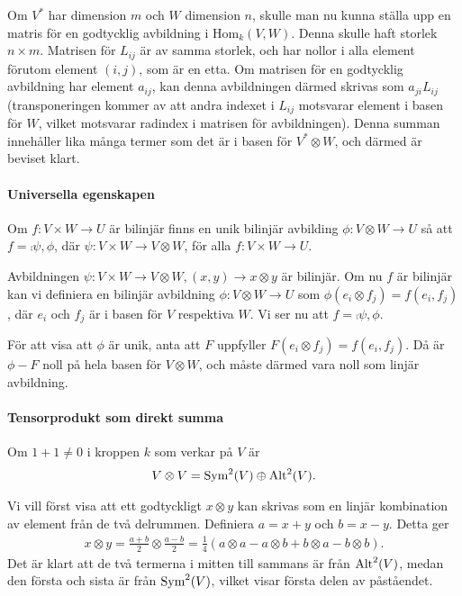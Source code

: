 Om $V^{*}$ har dimension $m$ och $W$ dimension $n$, skulle man nu kunna ställa upp en matris för en godtycklig avbildning i $\text{Hom}_{k}(V, W)$. Denna skulle haft storlek $n\times m$. Matrisen för $L_{ij}$ är av samma storlek, och har nollor i alla element förutom element $(i, j)$, som är en etta. Om matrisen för en godtycklig avbildning har element $a_{ij}$, kan denna avbildningen därmed skrivas som $a_{ji}L_{ij}$ (transponeringen kommer av att andra indexet i $L_{ij}$ motsvarar element i basen för $W$, vilket motsvarar radindex i matrisen för avbildningen). Denna summan innehåller lika många termer som det är i basen för $V^{*}\otimes W$, och därmed är beviset klart.

\paragraph{Universella egenskapen}
Om $f: V\times W\to U$ är bilinjär finns en unik bilinjär avbilding $\phi: V\otimes W\to U$ så att $f = \comp{{\psi, \phi}}$, där $\psi: V\times W\to V\otimes W$, för alla $f: V\times W\to U$.

\proof
Avbildningen $\psi: V\times W\to V\otimes W, (x, y)\to x\otimes y$ är bilinjär. Om nu $f$ är bilinjär kan vi definiera en bilinjär avbildning $\phi: V\otimes W\to U$ som $\phi(e_{i}\otimes f_{j}) = f(e_{i}, f_{j})$, där $e_{i}$ och $f_{j}$ är i basen för $V$ respektiva $W$. Vi ser nu att $f = \comp{{\psi, \phi}}$.

För att visa att $\phi$ är unik, anta att $F$ uppfyller $F(e_{i}\otimes f_{j}) = f(e_{i}, f_{j})$. Då är $\phi - F$ noll på hela basen för $V\otimes W$, och måste därmed vara noll som linjär avbildning.

\paragraph{Tensorprodukt som direkt summa}
Om $1 + 1\neq 0$ i kroppen $k$ som verkar på $V$ är
\begin{align*}
	V\otimes V = \Sym[2]{V} \oplus \Alt[2]{V}.
\end{align*}

\proof
Vi vill först visa att ett godtyckligt $x\otimes y$ kan skrivas som en linjär kombination av element från de två delrummen. Definiera $a = x + y$ och $b = x - y$. Detta ger
\begin{align*}
	x\otimes y = \frac{a + b}{2}\otimes\frac{a - b}{2} = \frac{1}{4}(a\otimes a - a\otimes b + b\otimes a - b\otimes b).
\end{align*}
Det är klart att de två termerna i mitten till sammans är från $\Alt[2]{V}$, medan den första och sista är från $\Sym[2]{V}$, vilket visar första delen av påståendet.

